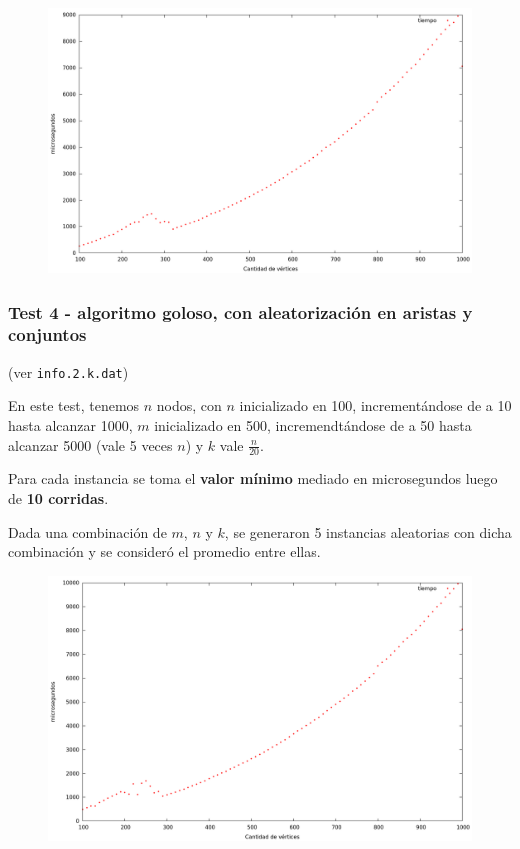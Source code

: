 \begin{figure}[h]
  \begin{center}
    \includegraphics[scale=0.35]{imagenes/grafico-greedy-c.png}
  \end{center}
\end{figure}

\vspace{0.5cm}


\newpage
\subsubsection{Test 4 - algoritmo goloso, con aleatorización en aristas y conjuntos}

(ver \verb|info.2.k.dat|) \medskip

En este test, tenemos $n$ nodos, con $n$ inicializado en 100, incrementándose de a 10 hasta alcanzar 1000, $m$ inicializado en 500, incremendtándose de a 50 hasta alcanzar 5000 (vale 5 veces $n$) y $k$ vale $\frac{n}{20}$.

Para cada instancia se toma el \textbf{valor mínimo} mediado en microsegundos luego de \textbf{10 corridas}.

Dada una combinación de $m$, $n$ y $k$, se generaron 5 instancias aleatorias con dicha combinación y se consideró el promedio entre ellas.

\vspace*{0.5cm}

\begin{figure}[h]
  \begin{center}
    \includegraphics[scale=0.35]{imagenes/grafico-greedy.png}
  \end{center}
\end{figure}

\vspace{0.5cm}
